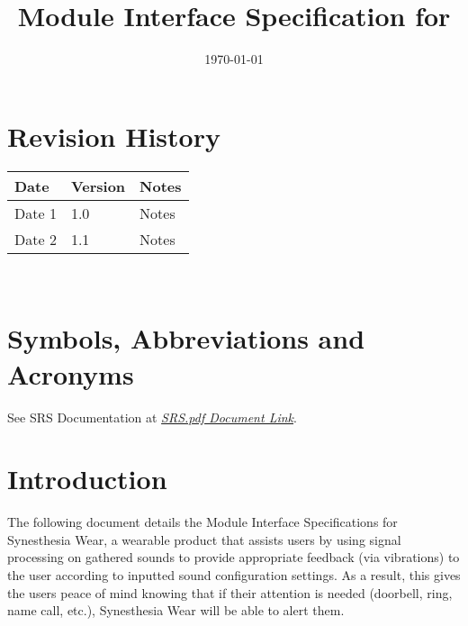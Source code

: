 \documentclass[12pt, titlepage]{article}
\begin{document}
\title{Module Interface Specification for \progname{}}

\author{\authname}

\date{\today}

\maketitle


\section*{Revision History}

\begin{tabularx}{\textwidth}{p{3cm}p{2cm}X}
\toprule {\bf Date} & {\bf Version} & {\bf Notes}\\
\midrule
Date 1 & 1.0 & Notes\\
Date 2 & 1.1 & Notes\\
\bottomrule
\end{tabularx}

~\newpage

\section*{Symbols, Abbreviations and Acronyms}

See SRS Documentation at  \href{https://github.com/jordanbierbrier/capstone/blob/main/docs/SRS/SRS.pdf}{\textit{SRS.pdf Document Link}}.


\newpage

\tableofcontents

\newpage


\section{Introduction}

The following document details the Module Interface Specifications for Synesthesia Wear, a wearable product that assists users by using signal processing on gathered sounds 
to provide appropriate feedback (via vibrations) to the user according to inputted sound configuration settings. As a result, this gives the users peace of mind knowing that if their attention 
is needed (doorbell, ring, name call, etc.), Synesthesia Wear will be able to alert them.
\end{document}
